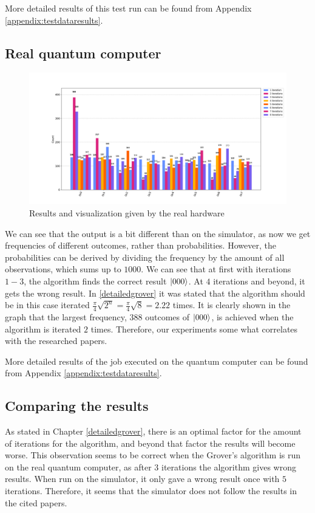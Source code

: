 \documentclass[english,oneside,openright]{UH_DS_report}
\begin{document}
 More detailed results of this test run can be found from Appendix \ref{appendix:testdataresults}.

\subsection{Real quantum computer}

\begin{figure}[h]
\caption{Results and visualization given by the real hardware}
\centering
\includegraphics[width=\linewidth]{images/hardware/Figure_1_qc.png}
\end{figure}

We can see that the output is a bit different than on the simulator, as now we get frequencies of different outcomes, rather than probabilities. However, the probabilities can be derived by dividing the frequency by the amount of all observations, which sums up to $1000$. We can see that at first with iterations $1 - 3$, the algorithm finds the correct result $\ket{000}$. At $4$ iterations and beyond, it gets the wrong result. In \ref{detailedgrover} it was stated that the algorithm should be in this case iterated $\frac{\pi}{4} \sqrt{2^{n}} = \frac{\pi}{4} \sqrt{8} = 2.22 $ times. It is clearly shown in the graph that the largest frequency, $388$ outcomes of $\ket{000}$, is achieved when the algorithm is iterated $2$ times. Therefore, our experiments some what correlates with the researched papers.

More detailed results of the job executed on the quantum computer can be found from Appendix \ref{appendix:testdataresults}.

\subsection{Comparing the results}
As stated in Chapter \ref{detailedgrover}, there is an optimal factor for the amount of iterations for the algorithm, and beyond that factor the results will become worse. This observation seems to be correct when the Grover's algorithm is run on the real quantum computer, as after $3$ iterations the algorithm gives wrong results. When run on the simulator, it only gave a wrong result once with $5$ iterations. Therefore, it seems that the simulator does not follow the results in the cited papers.
\end{document}
